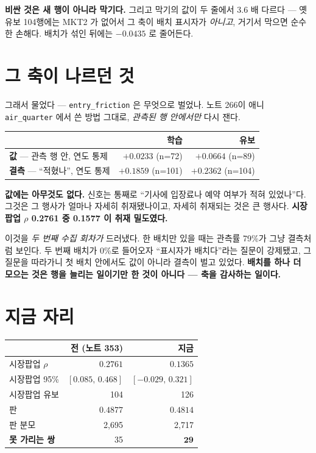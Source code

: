 \documentclass[11pt]{article}
\begin{document}
\textbf{비싼 것은 새 행이 아니라 막기다.} 그리고 막기의 값이 두 줄에서
$3.6$ 배 다르다 --- 옛 유보 104행에는 MKT2 가 없어서 그 축이 배치
표시자가 \emph{아니고}, 거기서 막으면 순수한 손해다. 배치가 섞인 뒤에는
$-0.0435$ 로 줄어든다.

\section{그 축이 나르던 것}

그래서 물었다 --- \texttt{entry\_friction} 은 무엇으로 벌었나. 노트 266이
애니 \texttt{air\_quarter} 에서 쓴 방법 그대로, \emph{관측된 행 안에서만}
다시 잰다.

\begin{center}
\begin{tabular}{lrr}
\hline
 & 학습 & 유보 \\
\hline
\textbf{값} --- 관측 행 안, 연도 통제 & $+0.0233$ (n=72) & $+0.0664$ (n=89) \\
\textbf{결측} --- ``적혔나'', 연도 통제 & $+0.1859$ (n=101) & $\mathbf{+0.2362}$ (n=104) \\
\hline
\end{tabular}
\end{center}

\textbf{값에는 아무것도 없다.} 신호는 통째로 ``기사에 입장료나 예약
여부가 적혀 있었나''다. 그것은 그 행사가 얼마나 자세히 취재됐나이고,
자세히 취재되는 것은 큰 행사다. \textbf{시장팝업 $\rho$ 0.2761 중
0.1577 이 취재 밀도였다.}

이것을 \emph{두 번째 수집 회차가} 드러냈다. 한 배치만 있을 때는 관측률
79\%가 그냥 결측처럼 보인다. 두 번째 배치가 0\%로 들어오자 ``표시자가
배치다''라는 질문이 강제됐고, 그 질문을 따라가니 첫 배치 안에서도 값이
아니라 결측이 벌고 있었다. \textbf{배치를 하나 더 모으는 것은 행을
늘리는 일이기만 한 것이 아니다 --- 축을 감사하는 일이다.}

\section{지금 자리}

\begin{center}
\begin{tabular}{lrr}
\hline
 & 전 (노트 353) & 지금 \\
\hline
시장팝업 $\rho$      & $0.2761$ & $\mathbf{0.1365}$ \\
시장팝업 95\%        & $[0.085,\,0.468]$ & $\mathbf{[-0.029,\,0.321]}$ \\
시장팝업 유보        & 104 & 126 \\
판                   & $0.4877$ & $0.4814$ \\
판 분모              & 2,695 & 2,717 \\
\textbf{못 가리는 쌍}& 35 & $\mathbf{29}$ \\
\hline
\end{tabular}
\end{center}
\end{document}
